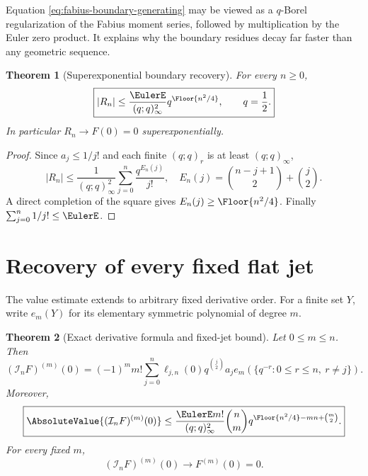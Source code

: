 \documentclass[11pt,oneside]{book}
\numberwithin{equation}{chapter}
\newtheorem{theorem}{Theorem}[chapter]
\theoremstyle{definition}
\theoremstyle{remark}
\newcommand{\Interp}{\mathcal I}
\begin{document}
Equation \eqref{eq:fabius-boundary-generating} may be viewed as a
$q$-Borel regularization of the Fabius moment series, followed by
multiplication by the Euler zero product.  It explains why the boundary
residues decay far faster than any geometric sequence.

\begin{theorem}[Superexponential boundary recovery]
\label{thm:fabius-boundary-bound}
For every $n\ge0$,
\begin{equation}
 \boxed{
 |R_n|\le
 \frac{\EulerE}{(q;q)_\infty^2}
 q^{\Floor{n^2/4}},
 \qquad q=\frac12.}
 \label{eq:fabius-boundary-bound}
\end{equation}
In particular $R_n\to F(0)=0$ superexponentially.
\end{theorem}

\begin{proof}
Since $a_j\le1/j!$ and each finite $(q;q)_r$ is at least
$(q;q)_\infty$,
\[
 |R_n|\le\frac1{(q;q)_\infty^2}
 \sum_{j=0}^{n}\frac{q^{E_n(j)}}{j!},
 \quad
 E_n(j)=\binom{n-j+1}{2}+\binom j2.
\]
A direct completion of the square gives
$E_n(j)\ge\Floor{n^2/4}$.  Finally
$\sum_{j=0}^n1/j!\le\EulerE$.
\end{proof}

\section{Recovery of every fixed flat jet}

The value estimate extends to arbitrary fixed derivative order.  For a
finite set $Y$, write $e_m(Y)$ for its elementary symmetric polynomial of
degree $m$.

\begin{theorem}[Exact derivative formula and fixed-jet bound]
\label{thm:fabius-fixed-jets}
Let $0\le m\le n$.  Then
\begin{equation}
 \boxed{
 (\Interp_nF)^{(m)}(0)
 =(-1)^mm!\sum_{j=0}^{n}
 \ell_{j,n}(0)q^{\binom j2}a_j
 e_m\!\left(\{q^{-r}:0\le r\le n,\ r\ne j\}\right).}
 \label{eq:fabius-jet-exact}
\end{equation}
Moreover,
\begin{equation}
 \boxed{
 \AbsoluteValue{(\Interp_nF)^{(m)}(0)}
 \le \frac{\EulerE m!}{(q;q)_\infty^2}
 \binom nm
 q^{\Floor{n^2/4}-mn+\binom m2}.}
 \label{eq:fabius-jet-bound}
\end{equation}
For every fixed $m$,
\begin{equation}
 (\Interp_nF)^{(m)}(0)\longrightarrow F^{(m)}(0)=0.
 \label{eq:fabius-fixed-jet-convergence}
\end{equation}
\end{theorem}
\end{document}
